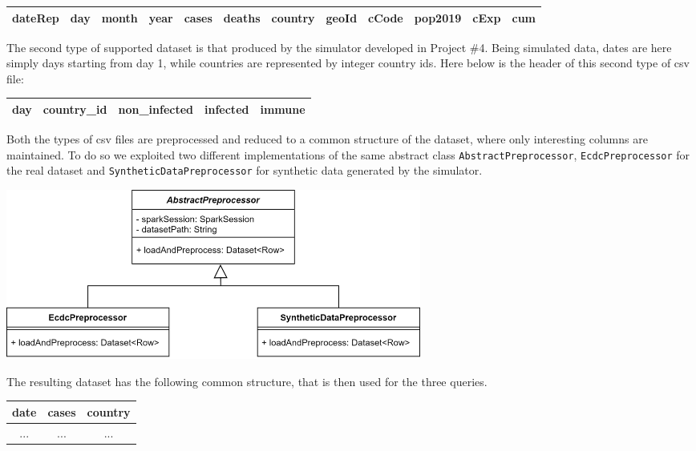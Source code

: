 \documentclass[11pt]{article}
\begin{document}
\begin{center}
\scriptsize %
\begin{tabular}{|c|c|c|c|c|c|c|c|c|c|c|c|}
  \hline
  \textbf{dateRep} & \textbf{day} & \textbf{month} & \textbf{year} & \textbf{cases} & \textbf{deaths} & \textbf{country} & \textbf{geoId} & \textbf{cCode} & \textbf{pop2019} & \textbf{cExp} & \textbf{cum} \\
  \hline
\end{tabular}
\end{center}

The second type of supported dataset is that produced by the simulator developed in Project \#4. Being simulated data, dates are here simply days starting from day 1, while countries are represented by integer country ids.
Here below is the header of this second type of csv file:

\begin{center}
\scriptsize %
\begin{tabular}{|c|c|c|c|c|}
  \hline
  \textbf{day} & \textbf{country\_id} & \textbf{non\_infected} & \textbf{infected} & \textbf{immune} \\
  \hline
\end{tabular}
\end{center}

Both the types of csv files are preprocessed and reduced to a common structure of the dataset, where only interesting columns are maintained.
To do so we exploited two different implementations of the same abstract class \texttt{AbstractPreprocessor}, \texttt{EcdcPreprocessor} for the real dataset and \texttt{SyntheticDataPreprocessor} for synthetic data generated by the simulator.

\begin{center}
    \includegraphics[width=0.6\textwidth]{preprocessor.png}
    \label{fig:preprocessor}
\end{center}

The resulting dataset has the following common structure, that is then used for the three queries.

\begin{center}
\scriptsize %
\begin{tabular}{|c|c|c|}
  \hline
  \textbf{date} & \textbf{cases} & \textbf{country} \\
  \hline
  ... & ... & ... \\
  \hline
\end{tabular}
\end{center}
\end{document}
